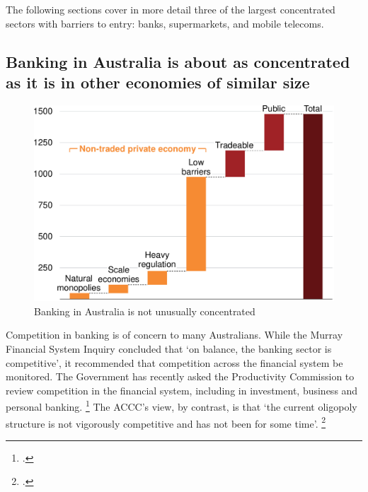 

The following sections cover in more detail three of the largest concentrated sectors with barriers to entry: banks, supermarkets, and mobile telecoms.

\clearpage

\subsection{Banking in Australia is about as concentrated as it is in other economies of similar size}

\begin{figure}
   \caption{Banking in Australia is not unusually concentrated \label{fig:banks_OECD}}
    \includegraphics[page=8]{atlas/Charts} 
\end{figure}

Competition in banking is of concern to many Australians. While the Murray Financial System Inquiry concluded that `on balance, the banking sector is competitive', it recommended that competition across the financial system be monitored. The Government has recently asked the Productivity Commission to review competition in the financial system, including in investment, business and personal banking.%
    \footcites{PC-FScompetition-2017,FSI-2014}
The ACCC's view, by contrast, is that `the current oligopoly structure is not vigorously competitive and has not been for some time'.
\footcite{ACCC-PC-submission}

